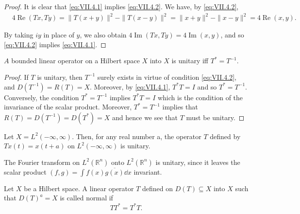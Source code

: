 \begin{proof}
 It is clear that \eqref{eq:VII.4.1} implies \eqref{eq:VII.4.2}. We have, by \eqref{eq:VII.4.2}, 
\[ \begin{aligned}
&4 \operatorname{Re} (T x, T y)  = \| T (x + y) \| ^{2} - \| T (x - y) \| ^{2} = \| x + y \| ^{2} - \| x - y \| ^{2} = 4 \operatorname{Re} (x, y).
\end{aligned}
\]

By taking $iy$ in place of $y$, we also obtain $4\operatorname{Im}(Tx, Ty) = 4\operatorname{Im}(x, y)$, and so \eqref{eq:VII.4.2} implies \eqref{eq:VII.4.1}. 
\end{proof}

\begin{proposition}\label{prop:VII.4.Proposition.2} $A$ bounded linear operator on a Hilbert space $X$ into $X$ is unitary iff $T^{*} = T^{-1}$. 
\end{proposition}

\begin{proof}
 If $T$ is unitary, then $T^{-1}$ surely exists in virtue of condition \eqref{eq:VII.4.2}, and $D(T^{-1}) = R(T) = X$. Moreover, by \eqref{eq:VII.4.1}, $T^{*}T = I$ and so $T^{*} = T^{-1}$. Conversely, the condition $T^{*} = T^{-1}$ implies $T^{*}T = I$ which is the condition of the invariance of the scalar product. Moreover, $T^{*} = T^{-1}$ implies that $R(T) = D(T^{-1}) = D(T^{*}) = X$ and hence we see that $T$ must be unitary. 
\end{proof}

\begin{example}\label{ex:VII.4.Example.1} Let $X = L^{2}(-\infty, \infty)$. Then, for any real number a, the operator $T$ defined by $Tx(t) = x(t + a)$ on $L^{2}(-\infty, \infty)$ is unitary. 
\end{example}

\begin{example}\label{ex:VII.4.Example.2} The Fourier transform on $L^2(\mathbb{R}^{n})$ onto $L^2(\mathbb{R}^{n})$ is unitary, since it leaves the scalar product $(f, g) = \int f(x) \overline{g(x)} \dd x$ invariant. 
\end{example}

\begin{definition}\label{def:VII.4.Definition.2} Let $X$ be a Hilbert space. A linear operator $T$ defined on $D(T) \subseteq X$ into $X$ such that $D(T)^a = X$ is called normal if 
\begin{equation}\label{eq:VII.4.3}
T T ^{*} = T ^{*} T.
\end{equation}
\end{definition}

